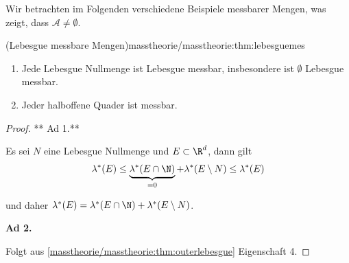 \documentclass[letterpaper,10pt,english]{jupyterBook}
\begin{document}
\par
Wir betrachten im Folgenden verschiedene Beispiele messbarer Mengen, was zeigt, dass \(\mathcal{A}\neq \emptyset\).
\begin{lemma}{(Lebesgue messbare Mengen)}{masstheorie/masstheorie:thm:lebesguemes}


\begin{enumerate}

\item {} 
\par
Jede Lebesgue Nullmenge ist Lebesgue messbar, insbesondere ist \(\emptyset\) Lebesgue messbar.

\item {} 
\par
Jeder halboffene Quader ist messbar.

\end{enumerate}
\end{lemma}

\begin{proof}
 ** Ad 1.**

\par
Es sei \(N\) eine Lebesgue Nullmenge und \(E\subset\R^d\), dann gilt
\begin{align*}
\lambda^\ast(E) \leq \underbrace{\lambda^\ast(E\cap\N)}_{=0} + \lambda^\ast(E\setminus N)\leq
 \lambda^\ast(E)
\end{align*}
\par
und daher \(\lambda^\ast(E) = \lambda^\ast(E\cap\N) + \lambda^\ast(E\setminus N)\).

\par
\textbf{Ad 2.}

\par
Folgt aus \cref{masstheorie/masstheorie:thm:outerlebesgue} Eigenschaft 4.
\end{proof}
\end{document}
